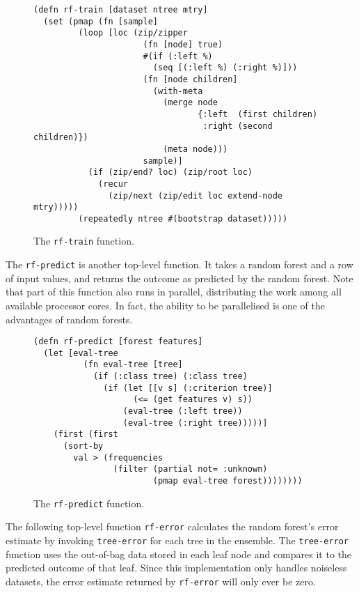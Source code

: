 \documentclass[a4paper,man,12pt,apacite,floatsintext,draftfirst]{apa6} %
\begin{document}
\begin{figure}[H]
\caption{The \texttt{rf-train} function.}
\begin{verbatim}
(defn rf-train [dataset ntree mtry]
  (set (pmap (fn [sample]
         (loop [loc (zip/zipper
                      (fn [node] true)
                      #(if (:left %)
                        (seq [(:left %) (:right %)]))
                      (fn [node children]
                        (with-meta
                          (merge node
                                 {:left  (first children)
                                  :right (second children)})
                          (meta node)))
                      sample)]
           (if (zip/end? loc) (zip/root loc)
             (recur
               (zip/next (zip/edit loc extend-node mtry)))))
         (repeatedly ntree #(bootstrap dataset)))))
\end{verbatim}
\end{figure}

The \texttt{rf-predict} is another top-level function.
It takes a random forest and a row of input values, and returns the outcome as
predicted by the random forest.
Note that part of this function also runs in parallel, distributing the work among all
available processor cores.
In fact, the ability to be parallelised is one of the advantages of random forests.

\begin{figure}[H]
\caption{The \texttt{rf-predict} function.}
\begin{verbatim}
(defn rf-predict [forest features]
  (let [eval-tree
          (fn eval-tree [tree]
            (if (:class tree) (:class tree)
              (if (let [[v s] (:criterion tree)]
                    (<= (get features v) s))
                  (eval-tree (:left tree))
                  (eval-tree (:right tree)))))]
    (first (first
      (sort-by
        val > (frequencies
                (filter (partial not= :unknown)
                        (pmap eval-tree forest))))))))
\end{verbatim}
\end{figure}

The following top-level function \texttt{rf-error} calculates the random forest's
error estimate by invoking \texttt{tree-error} for each tree in the ensemble.
The \texttt{tree-error} function uses the out-of-bag data stored in each leaf node
and compares it to the predicted outcome of that leaf.
Since this implementation only handles noiseless datasets, the error estimate
returned by \texttt{rf-error} will only ever be zero.
\end{document}
